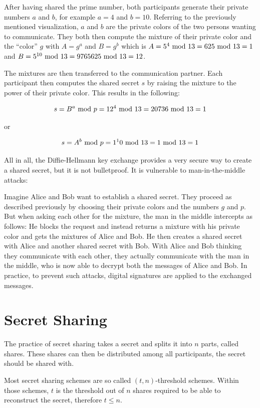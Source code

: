 After having shared the prime number, both participants generate their
private numbers $a$ and $b$, for example $a = 4$ and $b = 10$. Referring to the
previously mentioned visualization, $a$ and $b$ are the private colors of the
two persons wanting to communicate. They both then compute the mixture of their
private color and the ``color'' $g$ with $A = g^a$ and $B = g^b$ which is
$A = 5^4 \ \text{mod}\ 13 = 625 \ \text{mod}\ 13 = 1$ and $B = 5^{10} \ \text{mod}\ 13 = 9765625 \ \text{mod}\ 13 = 12$.

The mixtures are then transferred to the communication partner. Each
participant then computes the shared secret $s$ by raising the mixture
to the power of their private color. This results in the following:

$$s = B^a \ \text{mod}\ p = 12^4 \ \text{mod}\ 13 = 20736 \ \text{mod}\ 13 = 1$$

or

$$s = A^b \ \text{mod}\ p = 1^10 \ \text{mod}\ 13 = 1 \ \text{mod}\ 13 = 1$$

All in all, the Diffie-Hellmann key exchange provides a very secure way
to create a shared secret, but it is not bulletproof. It is vulnerable
to man-in-the-middle attacks:

Imagine Alice and Bob want to establish a shared secret. They proceed as
described previously by choosing their private colors and the numbers $g$
and $p$. But when asking each other for the mixture, the man in the middle
intercepts as follows: He blocks the request and instead returns a mixture
with his private color and gets the mixtures of Alice and Bob. He then
creates a shared secret with Alice and another shared secret with Bob. With
Alice and Bob thinking they communicate with each other, they actually
communicate with the man in the middle, who is now able to decrypt both
the messages of Alice and Bob. In practice, to prevent such attacks, digital
signatures are applied to the exchanged messages.

\section{Secret Sharing}

The practice of secret sharing takes a secret and splits it into $n$ parts,
called shares. These shares can then be distributed among all participants, the
secret should be shared with.

Most secret sharing schemes are so called $(t, n)$-threshold schemes. Within
those schemes, $t$ is the threshold out of $n$ shares required to be able to
reconstruct the secret, therefore $t \leq n$.

